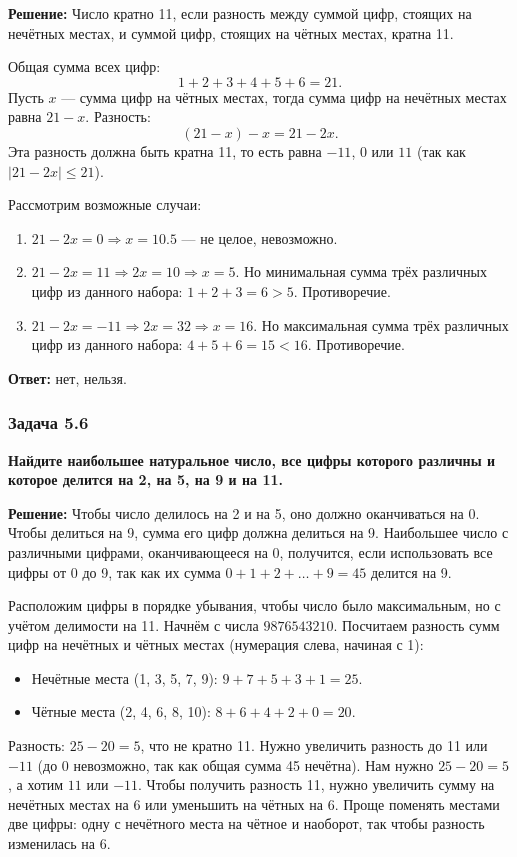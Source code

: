 \documentclass[12pt, a4paper]{article}
\begin{document}
\textbf{Решение:}
Число кратно 11, если разность между суммой цифр, стоящих на нечётных местах, и суммой цифр, стоящих на чётных местах, кратна 11.

Общая сумма всех цифр:
\[
1 + 2 + 3 + 4 + 5 + 6 = 21.
\]
Пусть $x$ — сумма цифр на чётных местах, тогда сумма цифр на нечётных местах равна $21 - x$. Разность:
\[
(21 - x) - x = 21 - 2x.
\]
Эта разность должна быть кратна 11, то есть равна $-11$, $0$ или $11$ (так как $|21 - 2x| \le 21$).

Рассмотрим возможные случаи:
\begin{enumerate}
    \item $21 - 2x = 0 \Rightarrow x = 10.5$ — не целое, невозможно.
    \item $21 - 2x = 11 \Rightarrow 2x = 10 \Rightarrow x = 5$. Но минимальная сумма трёх различных цифр из данного набора: $1 + 2 + 3 = 6 > 5$. Противоречие.
    \item $21 - 2x = -11 \Rightarrow 2x = 32 \Rightarrow x = 16$. Но максимальная сумма трёх различных цифр из данного набора: $4 + 5 + 6 = 15 < 16$. Противоречие.
\end{enumerate}

\textbf{Ответ:} нет, нельзя.

\subsubsection*{Задача 5.6}
\textbf{Найдите наибольшее натуральное число, все цифры которого различны и которое делится на 2, на 5, на 9 и на 11.}

\textbf{Решение:}
Чтобы число делилось на 2 и на 5, оно должно оканчиваться на 0. Чтобы делиться на 9, сумма его цифр должна делиться на 9. Наибольшее число с различными цифрами, оканчивающееся на 0, получится, если использовать все цифры от 0 до 9, так как их сумма $0+1+2+\dots+9 = 45$ делится на 9.

Расположим цифры в порядке убывания, чтобы число было максимальным, но с учётом делимости на 11. Начнём с числа $9876543210$. Посчитаем разность сумм цифр на нечётных и чётных местах (нумерация слева, начиная с 1):
\begin{itemize}
    \item Нечётные места (1, 3, 5, 7, 9): $9 + 7 + 5 + 3 + 1 = 25$.
    \item Чётные места (2, 4, 6, 8, 10): $8 + 6 + 4 + 2 + 0 = 20$.
\end{itemize}
Разность: $25 - 20 = 5$, что не кратно 11. Нужно увеличить разность до 11 или $-11$ (до 0 невозможно, так как общая сумма 45 нечётна). Нам нужно $25 - 20 = 5$, а хотим $11$ или $-11$. Чтобы получить разность 11, нужно увеличить сумму на нечётных местах на 6 или уменьшить на чётных на 6. Проще поменять местами две цифры: одну с нечётного места на чётное и наоборот, так чтобы разность изменилась на 6.
\end{document}
